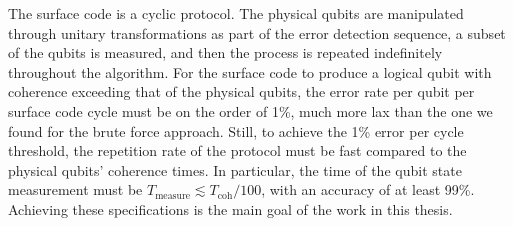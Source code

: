 The surface code is a cyclic protocol.
The physical qubits are manipulated through unitary transformations as part of the error detection sequence, a subset of the qubits is measured, and then the process is repeated indefinitely throughout the algorithm.
For the surface code to produce a logical qubit with coherence exceeding that of the physical qubits, the error rate per qubit per surface code cycle must be on the order of 1\%, much more lax than the one we found for the brute force approach.
Still, to achieve the 1\% error per cycle threshold, the repetition rate of the protocol must be fast compared to the physical qubits' coherence times.
In particular, the time of the qubit state measurement must be $T_{\text{measure}} \lesssim T_{\text{coh}}/100$, with an accuracy of at least 99\%.
Achieving these specifications is the main goal of the work in this thesis.
